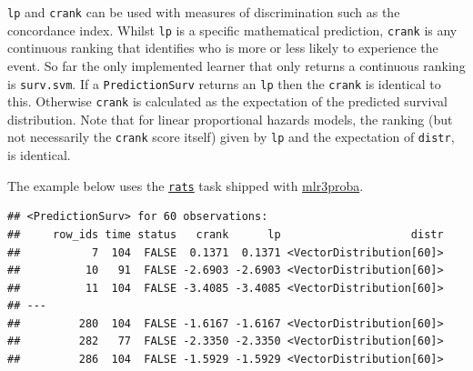 \documentclass[
]{scrbook}
\newenvironment{Shaded}{\begin{snugshade}}{\end{snugshade}}
\newcommand{\AttributeTok}[1]{\textcolor[rgb]{0.77,0.63,0.00}{#1}}
\newcommand{\FloatTok}[1]{\textcolor[rgb]{0.00,0.00,0.81}{#1}}
\newcommand{\FunctionTok}[1]{\textcolor[rgb]{0.00,0.00,0.00}{#1}}
\newcommand{\NormalTok}[1]{#1}
\newcommand{\OtherTok}[1]{\textcolor[rgb]{0.56,0.35,0.01}{#1}}
\newcommand{\SpecialCharTok}[1]{\textcolor[rgb]{0.00,0.00,0.00}{#1}}
\newcommand{\StringTok}[1]{\textcolor[rgb]{0.31,0.60,0.02}{#1}}
\renewenvironment{Shaded} {\begin{snugshade}\small} {\end{snugshade}}
\begin{document}
\texttt{lp} and \texttt{crank} can be used with measures of discrimination such as the concordance index.
Whilst \texttt{lp} is a specific mathematical prediction, \texttt{crank} is any continuous ranking that identifies who is more or less likely to experience the event.
So far the only implemented learner that only returns a continuous ranking is \texttt{surv.svm}.
If a \texttt{PredictionSurv} returns an \texttt{lp} then the \texttt{crank} is identical to this.
Otherwise \texttt{crank} is calculated as the expectation of the predicted survival distribution.
Note that for linear proportional hazards models, the ranking (but not necessarily the \texttt{crank} score itself) given by \texttt{lp} and the expectation of \texttt{distr}, is identical.

The example below uses the \href{https://mlr3proba.mlr-org.com/reference/mlr_tasks_rats.html}{\texttt{rats}} task shipped with \href{https://mlr3proba.mlr-org.com}{mlr3proba}.

\begin{Shaded}
\end{Shaded}

\begin{verbatim}
## <PredictionSurv> for 60 observations:
##     row_ids time status   crank      lp                    distr
##           7  104  FALSE  0.1371  0.1371 <VectorDistribution[60]>
##          10   91  FALSE -2.6903 -2.6903 <VectorDistribution[60]>
##          11  104  FALSE -3.4085 -3.4085 <VectorDistribution[60]>
## ---                                                             
##         280  104  FALSE -1.6167 -1.6167 <VectorDistribution[60]>
##         282   77  FALSE -2.3350 -2.3350 <VectorDistribution[60]>
##         286  104  FALSE -1.5929 -1.5929 <VectorDistribution[60]>
\end{verbatim}
\end{document}
